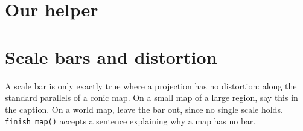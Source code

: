 \section{Our helper}


\section{Scale bars and distortion}
A scale bar is only exactly true where a projection has no distortion: along the standard parallels of a conic map. On a small map of a large region, say this in the caption. On a world map, leave the bar out, since no single scale holds. \texttt{finish\_map()} accepts a sentence explaining why a map has no bar.

